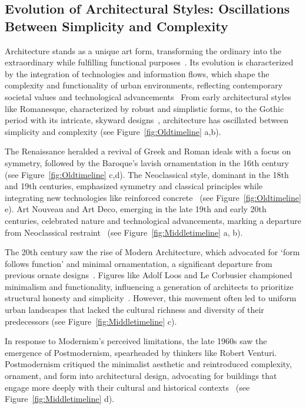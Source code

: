 \subsection{Evolution of Architectural Styles: Oscillations Between Simplicity and Complexity}
\label{subsec:TimelineArchitectureStyles}

Architecture stands as a unique art form, transforming the ordinary into the extraordinary while fulfilling functional purposes~\cite{Jiang2023}.
Its evolution is characterized by the integration of technologies and information flows, which shape the complexity and functionality of urban environments, reflecting contemporary societal values and technological advancements~\cite{Leach2015}
From early architectural styles like Romanesque, characterized by robust and simplistic forms, to the Gothic period with its intricate, skyward designs~\cite{Kennedy2013}, architecture has oscillated between simplicity and complexity (see Figure~\ref{fig:Oldtimeline} a,b).

The Renaissance heralded a revival of Greek and Roman ideals with a focus on symmetry, followed by the Baroque's lavish ornamentation in the 16th century~\cite{Marder1990} (see Figure~\ref{fig:Oldtimeline} c,d).
The Neoclassical style, dominant in the 18th and 19th centuries, emphasized symmetry and classical principles while integrating new technologies like reinforced concrete~\cite{Adebusuyi2022} (see Figure~\ref{fig:Oldtimeline} e).
Art Nouveau and Art Deco, emerging in the late 19th and early 20th centuries, celebrated nature and technological advancements, marking a departure from Neoclassical restraint~\cite{Salas2018} (see Figure~\ref{fig:Middletimeline} a, b).

The 20th century saw the rise of Modern Architecture, which advocated for `form follows function' and minimal ornamentation, a significant departure from previous ornate designs~\cite{Leach2016}.
Figures like Adolf Loos and Le Corbusier championed minimalism and functionality, influencing a generation of architects to prioritize structural honesty and simplicity~\cite{Saglam2014}.
However, this movement often led to uniform urban landscapes that lacked the cultural richness and diversity of their predecessors (see Figure~\ref{fig:Middletimeline} c).

In response to Modernism's perceived limitations, the late 1960s saw the emergence of Postmodernism, spearheaded by thinkers like Robert Venturi.
Postmodernism critiqued the minimalist aesthetic and reintroduced complexity, ornament, and form into architectural design, advocating for buildings that engage more deeply with their cultural and historical contexts~\cite{Venturi1972} (see Figure~\ref{fig:Middletimeline} d).

